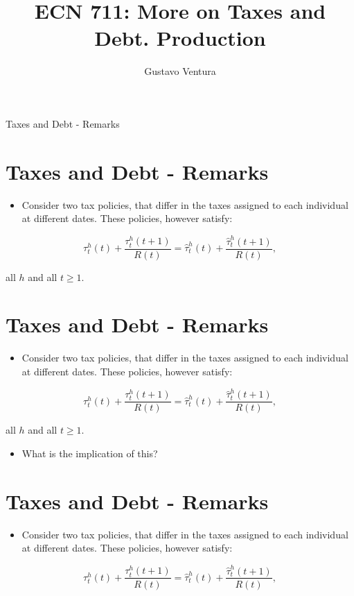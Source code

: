\documentclass[10pt]{article}
\title{ECN 711: More on Taxes and Debt. Production }
\author{Gustavo Ventura}
\date{}
\begin{document}
\maketitle
Taxes and Debt - Remarks

\section*{Taxes and Debt - Remarks}
\begin{itemize}
  \item Consider two tax policies, that differ in the taxes assigned to each individual at different dates. These policies, however satisfy:
\end{itemize}

$$
\tau_{t}^{h}(t)+\frac{\tau_{t}^{h}(t+1)}{R(t)}=\hat{\tau}_{t}^{h}(t)+\frac{\hat{\tau}_{t}^{h}(t+1)}{R(t)},
$$

all $h$ and all $t \geq 1$.

\section*{Taxes and Debt - Remarks}
\begin{itemize}
  \item Consider two tax policies, that differ in the taxes assigned to each individual at different dates. These policies, however satisfy:
\end{itemize}

$$
\tau_{t}^{h}(t)+\frac{\tau_{t}^{h}(t+1)}{R(t)}=\hat{\tau}_{t}^{h}(t)+\frac{\hat{\tau}_{t}^{h}(t+1)}{R(t)},
$$

all $h$ and all $t \geq 1$.

\begin{itemize}
  \item What is the implication of this?
\end{itemize}

\section*{Taxes and Debt - Remarks}
\begin{itemize}
  \item Consider two tax policies, that differ in the taxes assigned to each individual at different dates. These policies, however satisfy:
\end{itemize}

$$
\tau_{t}^{h}(t)+\frac{\tau_{t}^{h}(t+1)}{R(t)}=\hat{\tau}_{t}^{h}(t)+\frac{\hat{\tau}_{t}^{h}(t+1)}{R(t)},
$$
\end{document}
